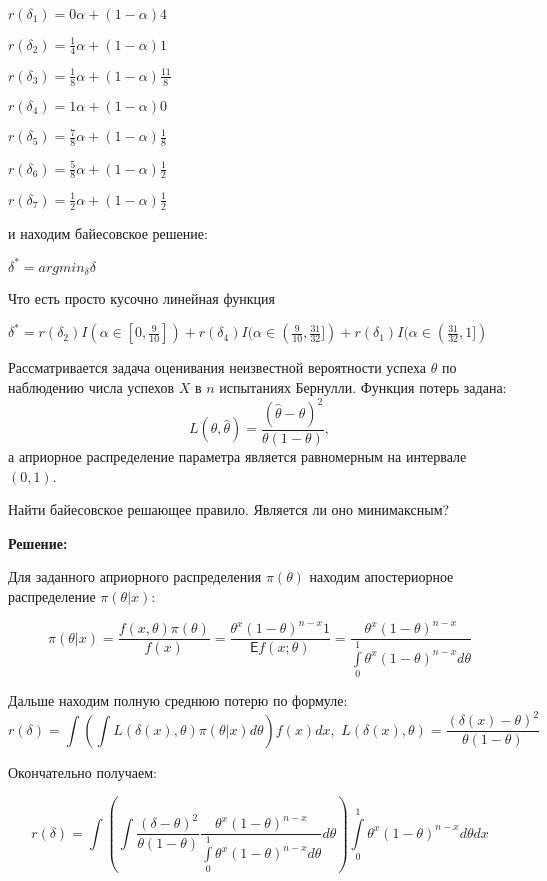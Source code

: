 \documentclass[12pt]{article}
\theoremstyle{definiton}
\theoremstyle{definition}
\theoremstyle{definition}
\newcommand{\Expect}{\mathsf{E}}
\newcounter{problem}
\newcounter{subproblem}
\def\prp{\medskip\noindent\stepcounter{problem}{\bf Задача \theproblem .  }\setcounter{subproblem}{0} }
\begin{document}
$r(\delta_1) = 0 \alpha + (1-\alpha)4$


$r(\delta_2) = \frac14 \alpha + (1-\alpha)1$

$r(\delta_3) = \frac18 \alpha + (1-\alpha)\frac{11}{8}$

$r(\delta_4) = 1 \alpha + (1-\alpha)0$

$r(\delta_5) = \frac78 \alpha + (1-\alpha)\frac{1}{8}$

$r(\delta_6) = \frac58 \alpha + (1-\alpha)\frac{1}{2}$

$r(\delta_7) = \frac12 \alpha + (1-\alpha)\frac12$

и находим байесовское решение:

$\delta^* = argmin_{\delta} \delta$

Что есть просто кусочно линейная функция 

$\delta^* =  r(\delta_2) I(\alpha \in [0, \frac{9}{10}]) + r(\delta_4) I(\alpha \in (\frac{9}{10},\frac{31}{32}]) + r(\delta_1) I(\alpha \in (\frac{31}{32}, 1])$



\prp Рассматривается задача оценивания неизвестной вероятности успеха $\theta$ по наблюдению числа успехов $X$ в $n$ испытаниях Бернулли. Функция потерь задана: $$L(\theta, \hat{\theta}) = \frac{(\hat{\theta} - \theta)^2}{\theta(1-\theta)},$$ а априорное распределение параметра является равномерным на интервале $(0, 1)$.

Найти байесовское решающее правило. Является ли оно минимаксным?

\textbf{Решение: } 

Для заданного априорного распределения $\pi(\theta)$ находим апостериорное распределение $\pi(\theta|x)$:

$$\pi(\theta|x) = \frac{f(x,\theta)\pi(\theta)}{f(x)} = \frac{\theta^x(1-\theta)^{n-x} 1}{\Expect f(x;\theta)} = \frac{\theta^x(1-\theta)^{n-x}}{\int\limits_0^1 \theta^x(1-\theta)^{n-x}d\theta}$$

Дальше находим полную среднюю потерю по формуле:
$$r(\delta) = \int \left( \int L(\delta(x), \theta)\pi(\theta|x)d\theta\right) f(x) dx, \,\,L(\delta(x), \theta) = \frac{(\delta(x) - \theta)^2}{\theta(1-\theta)}$$

Окончательно получаем:

$$r(\delta) = \int \left( \int \frac{(\delta - \theta)^2}{\theta(1-\theta)}\frac{\theta^x(1-\theta)^{n-x}}{\int\limits_0^1 \theta^x(1-\theta)^{n-x}d\theta}d\theta\right) \int\limits_0^1 \theta^x(1-\theta)^{n-x}d\theta dx$$
\end{document}
